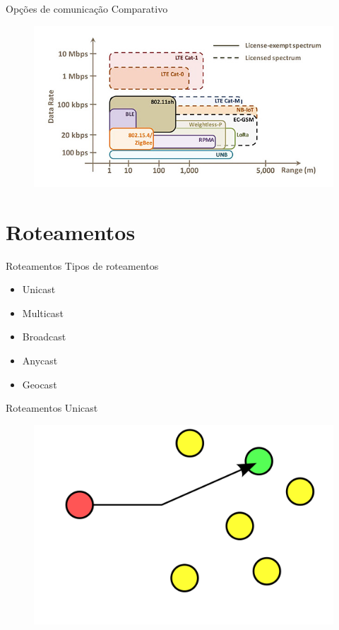 \documentclass[t]{beamer}
\begin{document}
\begin{frame}{Opções de comunicação}
Comparativo
\begin{figure}
	\includegraphics[width=\linewidth]{chart-range-vs-data}
\end{figure}
\end{frame}

\section{Roteamentos}

\begin{frame}{Roteamentos}
Tipos de roteamentos
\begin{itemize}
	\item Unicast
	\item Multicast
	\item Broadcast
	\item Anycast
	\item Geocast
\end{itemize}
\end{frame}

\begin{frame}{Roteamentos}
Unicast
\begin{figure}
	\includegraphics[width=\linewidth]{Unicast}
\end{figure}
\end{frame}
\end{document}
